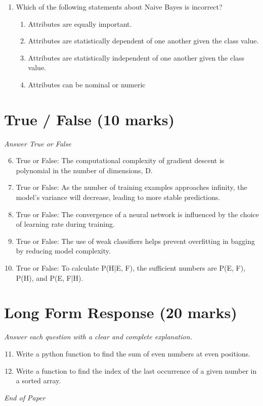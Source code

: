 \documentclass[12pt]{article}
\begin{document}
\begin{enumerate}[label=\arabic*.]
\begin{enumerate}[label=(\alph*)]
    \item Yann LeCun
    \item Stuart Russell
    \item Jitendra Malik
\end{enumerate}
\item Which of the following statements about Naive Bayes is incorrect?
\begin{enumerate}[label=(\alph*)]
    \item Attributes are equally important.
    \item Attributes are statistically dependent of one another given the class value.
    \item Attributes are statistically independent of one another given the class value.
    \item Attributes can be nominal or numeric
\end{enumerate}
\end{enumerate}

\section*{True / False (10 marks)}
\textit{Answer True or False}
\begin{enumerate}[label=\arabic*.]
\setcounter{enumi}{5}
\item True or False: The computational complexity of gradient descent is polynomial in the number of dimensions, D.
\item True or False: As the number of training examples approaches infinity, the model's variance will decrease, leading to more stable predictions.
\item True or False: The convergence of a neural network is influenced by the choice of learning rate during training.
\item True or False: The use of weak classifiers helps prevent overfitting in bagging by reducing model complexity.
\item True or False: To calculate P(H|E, F), the sufficient numbers are P(E, F), P(H), and P(E, F|H).
\end{enumerate}

\section*{Long Form Response (20 marks)}
\textit{Answer each question with a clear and complete explanation.}
\begin{enumerate}[label=\arabic*.]
\setcounter{enumi}{10}
\item Write a python function to find the sum of even numbers at even positions.
\item Write a function to find the index of the last occurrence of a given number in a sorted array.
\end{enumerate}

\vfill
\noindent\textit{End of Paper}
\end{document}
